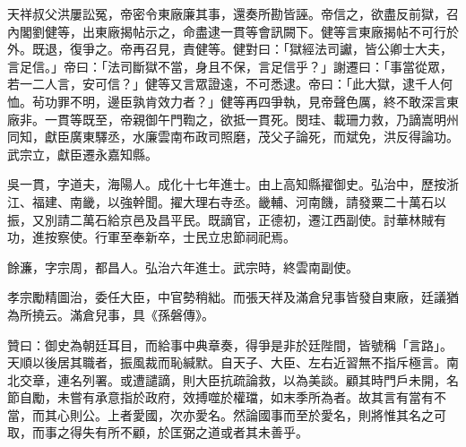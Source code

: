 \begin{pinyinscope}
天祥叔父洪屢訟冤，帝密令東廠廉其事，還奏所勘皆誣。帝信之，欲盡反前獄，召內閣劉健等，出東廠揭帖示之，命盡逮一貫等會訊闕下。健等言東廠揭帖不可行於外。既退，復爭之。帝再召見，責健等。健對曰：「獄經法司讞，皆公卿士大夫，言足信。」帝曰：「法司斷獄不當，身且不保，言足信乎？」謝遷曰：「事當從眾，若一二人言，安可信？」健等又言眾證遠，不可悉逮。帝曰：「此大獄，逮千人何恤。茍功罪不明，邊臣孰肯效力者？」健等再四爭執，見帝聲色厲，終不敢深言東廠非。一貫等既至，帝親御午門鞫之，欲抵一貫死。閔珪、載珊力救，乃謫嵩明州同知，獻臣廣東驛丞，水廉雲南布政司照磨，茂父子論死，而斌免，洪反得論功。武宗立，獻臣遷永嘉知縣。

吳一貫，字道夫，海陽人。成化十七年進士。由上高知縣擢御史。弘治中，歷按浙江、福建、南畿，以強幹聞。擢大理右寺丞。畿輔、河南饑，請發粟二十萬石以振，又別請二萬石給京邑及昌平民。既謫官，正德初，遷江西副使。討華林賊有功，進按察使。行軍至奉新卒，士民立忠節祠祀焉。

餘濂，字宗周，都昌人。弘治六年進士。武宗時，終雲南副使。

孝宗勵精圖治，委任大臣，中官勢稍絀。而張天祥及滿倉兒事皆發自東廠，廷議猶為所撓云。滿倉兒事，具《孫磐傳》。

贊曰：御史為朝廷耳目，而給事中典章奏，得爭是非於廷陛間，皆號稱「言路」。天順以後居其職者，振風裁而恥緘默。自天子、大臣、左右近習無不指斥極言。南北交章，連名列署。或遭譴謫，則大臣抗疏論救，以為美談。顧其時門戶未開，名節自勵，未嘗有承意指於政府，效搏噬於權璫，如末季所為者。故其言有當有不當，而其心則公。上者愛國，次亦愛名。然論國事而至於愛名，則將惟其名之可取，而事之得失有所不顧，於匡弼之道或者其未善乎。


\end{pinyinscope}